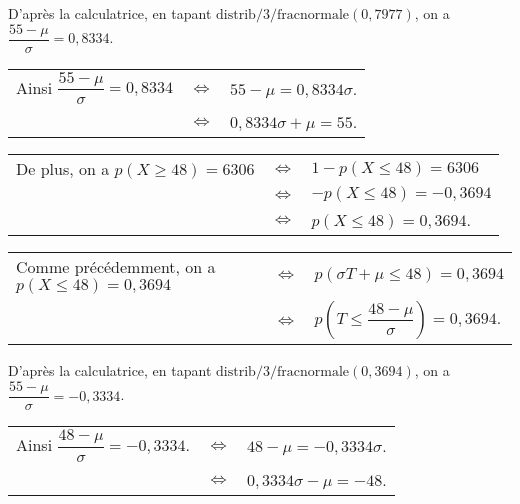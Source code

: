 \vspace*{.3cm}

D'après la calculatrice, en tapant $\mathrm{distrib}/3/\mathrm{fracnormale}\left(0,7977\right)$, on a $\dfrac{55 - \mu}{\sigma} = 0,8334$. \\

\begin{tabular}{lll}
\hspace*{-.3cm} Ainsi $\dfrac{55 - \mu}{\sigma} = 0,8334$ & $\Longleftrightarrow$ & $55 - \mu = 0,8334\sigma$. \vspace*{.3cm} \\
& $\Longleftrightarrow$ & $0,8334\sigma + \mu = 55$. \\ 
\end{tabular}

\vspace*{.3cm}

\begin{tabular}{lll}
\hspace*{-.3cm} De plus, on a $p\left(X \geqslant 48\right) = 6306$ & $\Longleftrightarrow$ & $1 - p\left(X \leqslant 48\right) = 6306$ \\
& $\Longleftrightarrow$ & $-p\left(X \leqslant 48\right) = -0,3694$ \\
& $\Longleftrightarrow$ & $p\left(X \leqslant 48\right) = 0,3694$. \\
\end{tabular}

\vspace*{.3cm}

\begin{tabular}{lll}
\hspace*{-.3cm} Comme précédemment, on a $p\left(X \leqslant 48\right) = 0,3694$ & $\Longleftrightarrow$ & $p\left(\sigma T + \mu \leqslant 48\right) = 0,3694$ \vspace*{.3cm} \\
& $\Longleftrightarrow$ & $p\left(T \leqslant \dfrac{48 - \mu}{\sigma}\right) = 0,3694$. \\
\end{tabular}

\vspace*{.3cm}

D'après la calculatrice, en tapant $\mathrm{distrib}/3/\mathrm{fracnormale}\left(0,3694\right)$, on a $\dfrac{55 - \mu}{\sigma} = -0,3334$. \\

\begin{tabular}{lll}
\hspace*{-.3cm} Ainsi $\dfrac{48 - \mu}{\sigma} = -0,3334$. & $\Longleftrightarrow$ & $48 - \mu = -0,3334\sigma$. \vspace*{.3cm} \\
& $\Longleftrightarrow$ & $0,3334\sigma - \mu = -48$. \\ 
\end{tabular}


